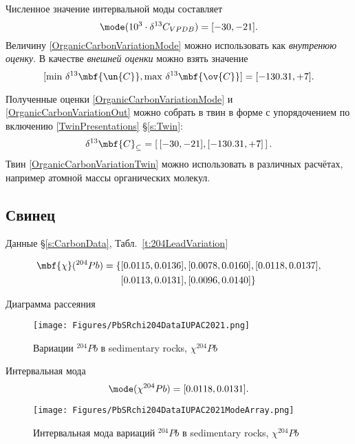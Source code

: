 \documentclass[a5paper,openany]{book}
\begin{document}
Численное значение интервальной моды составляет 
\begin{equation}\label{OrganicCarbonVariationMode}
	\mode ( 10^3 \cdot \delta ^{13}C_{VPDB} ) = [-30, -21].
\end{equation}
Величину \eqref{OrganicCarbonVariationMode} можно использовать как \emph{внутренюю оценку}.
В качестве \emph{внешней оценки} можно взять значение
\begin{equation}\label{OrganicCarbonVariationOut}
[\min \, \delta ^{13}\mbf{\un{C}},  \max \, \delta ^{13}\mbf{\ov{C}}] = [ -130.31, +7 ].
\end{equation}

Полученные оценки \eqref{OrganicCarbonVariationMode} и \eqref{OrganicCarbonVariationOut} можно собрать в твин в форме с упорядочением по включению \eqref{TwinPresentations} \S\ref{s:Twin}:
\begin{equation}\label{OrganicCarbonVariationTwin}
\delta ^{13}\mbf{C}_{\subseteq} = \left[ \, [-30, -21], [-130.31, +7] \, \right].
\end{equation}
Твин \eqref{OrganicCarbonVariationTwin} можно использовать в различных расчётах, например атомной массы органических молекул.

\subsection{Свинец}

Данные \S\ref{s:CarbonData}, Табл.~\ref{t:204LeadVariation}

\begin{align}
\mbf{\chi} (^{204}Pb) =	 \{	& [ 0.0115, 0.0136 ], 	[ 0.0078, 0.0160 ], [ 0.0118, 0.0137 ] , \nonumber \\
& [ 0.0113, 0.0131 ], [ 0.0096, 0.0140 ] 	\} 
\end{align}

Диаграмма рассеяния 
\begin{figure}[ht] 
	\centering\small
	\unitlength=1mm
	{\texttt{[image: Figures/PbSRchi204DataIUPAC2021.png]}} 
	\caption{Вариации $^{204}Pb$ в sedimentary rocks,  $ \chi ^{204}Pb$}
	\label{f:PbSRchi204DataIUPAC2021}
\end{figure}

Интервальная мода 
\begin{equation}
	\mode ( \chi ^{204}Pb) = [0.0118, 0.0131].
\end{equation}

\begin{figure}[ht] 
	\begin{center}
		\unitlength=1mm
		{\texttt{[image: Figures/PbSRchi204DataIUPAC2021ModeArray.png]}} 
		\caption{Интервальная мода 
			вариаций  $^{204}Pb$ в sedimentary rocks,  $ \chi ^{204}Pb$} 
		\label{f:PbSRchi204DataIUPAC2021Mode}
	\end{center}	
\end{figure}
\end{document}
